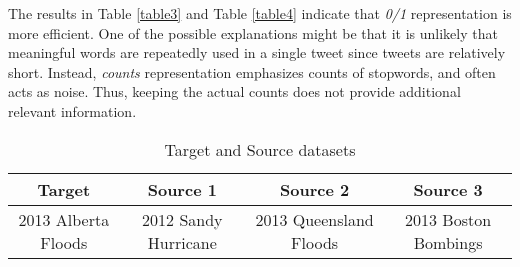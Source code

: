 The results in Table \ref{table3} and Table \ref{table4} indicate that \textit{0/1} representation is more efficient. One of the possible explanations might be that it is unlikely that meaningful words are repeatedly used in a single tweet since tweets are relatively short. Instead, \textit{counts} representation emphasizes counts of stopwords, and often acts as noise. Thus, keeping the actual counts does not provide additional relevant information.


\begin{table}[ht]
    \begin{center}
    \caption{Target and Source datasets}
    \begin{tabular}[c]{|c|c|c|c|}
        \hline
        Target & Source 1 & Source 2 & Source 3 \\
        \hline
        2013 Alberta Floods & 2012 Sandy Hurricane & 2013 Queensland Floods & 2013 Boston Bombings \\
        \hline
    \end{tabular}
    \label{table1}
   \end{center}
\end{table}


